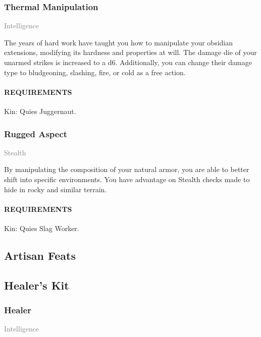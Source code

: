     \subsubsection{Thermal Manipulation} \label{feat::thermalmanipulation}
    \small{\textcolor{gray}{Intelligence}}

    \normalsize
    The years of hard work have taught you how to manipulate your obsidian extensions, modifying its hardness and properties at will.
    The damage die of your unarmed strikes is increased to a d6.
    Additionally, you can change their damage type to bludgeoning, slashing, fire, or cold as a free action.
    \paragraph{REQUIREMENTS} Kin: Quies Juggernaut.

    \subsubsection{Rugged Aspect} \label{feat::ruggedaspect}
    \small{\textcolor{gray}{Stealth}}

    \normalsize
    By manipulating the composition of your natural armor, you are able to better shift into specific environments.
    You have advantage on Stealth checks made to hide in rocky and similar terrain.
    \paragraph{REQUIREMENTS} Kin: Quies Slag Worker.


\subsection{Artisan Feats}
\subsection*{Healer's Kit}
    \subsubsection{Healer} \label{feat::healer}
    \small{\textcolor{gray}{Intelligence}} %

